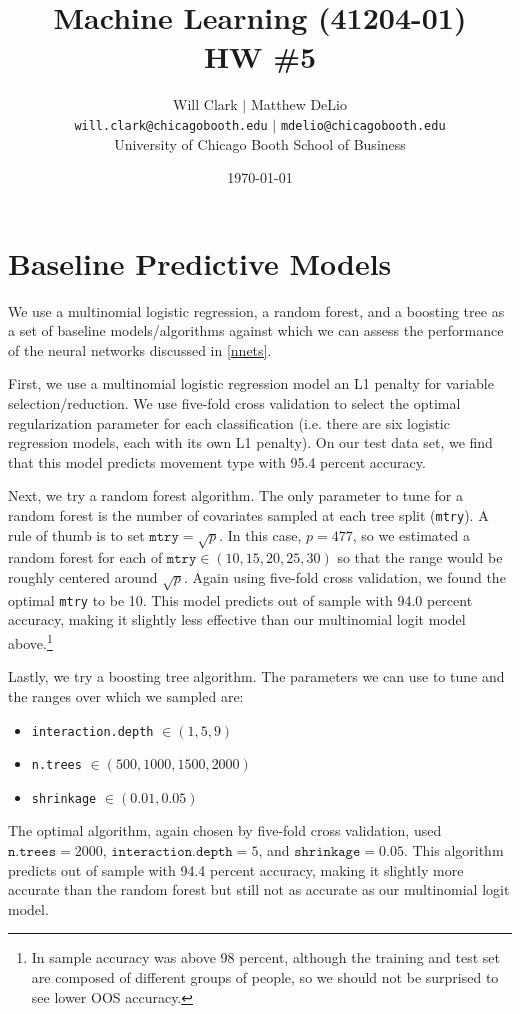 



\title{Machine Learning (41204-01)\\HW \#5}
\author{Will Clark $\vert$ Matthew DeLio \\
\texttt{will.clark@chicagobooth.edu} $\vert$ \texttt{mdelio@chicagobooth.edu} \\
University of Chicago Booth School of Business}
\date{\today}
\maketitle

\section{Baseline Predictive Models} \label{baseline}

We use a multinomial logistic regression, a random forest, and a boosting tree as a set of baseline models/algorithms against which we can assess the performance of the neural networks discussed in \cref{nnets}. 

First, we use a multinomial logistic regression model an L1 penalty for variable selection/reduction. We use five-fold cross validation to select the optimal regularization parameter for each classification (i.e. there are six logistic regression models, each with its own L1 penalty). On our test data set, we find that this model predicts movement type with 95.4 percent accuracy. 

Next, we try a random forest algorithm. The only parameter to tune for a random forest is the number of covariates sampled at each tree split (\texttt{mtry}). A rule of thumb is to set $\texttt{mtry}=\sqrt{p}$. In this case, $p=477$, so we estimated a random forest for each of $\texttt{mtry}\in(10, 15, 20, 25, 30)$ so that the range would be roughly centered around $\sqrt{p}$. Again using five-fold cross validation, we found the optimal \texttt{mtry} to be 10. This model predicts out of sample with 94.0 percent accuracy, making it slightly less effective than our multinomial logit model above.\footnote{In sample accuracy was above 98 percent, although the training and test set are composed of different groups of people, so we should not be surprised to see lower OOS accuracy.}

Lastly, we try a boosting tree algorithm. The parameters we can use to tune and the ranges over which we sampled are:
\begin{itemize}
\item \texttt{interaction.depth} $\in (1, 5, 9)$
\item \texttt{n.trees} $\in (500, 1000, 1500, 2000)$
\item \texttt{shrinkage} $\in (0.01, 0.05)$
\end{itemize}
The optimal algorithm, again chosen by five-fold cross validation, used $\texttt{n.trees}=2000$, $\texttt{interaction.depth}=5$, and $\texttt{shrinkage}=0.05$. This algorithm predicts out of sample with 94.4 percent accuracy, making it slightly more accurate than the random forest but still not as accurate as our multinomial logit model.

